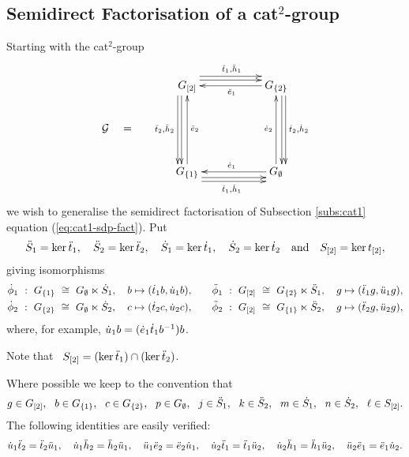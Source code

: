 

\bigskip
\subsection{Semidirect Factorisation of a cat$^2$-group}
\label{subs:sdpfact-catt}

Starting with the cat$^2$-group 
$$
\xymatrix @C=2pc @R=2pc{
 & \GGot \ar[dd] <-1.2ex>  \ar[dd] <-2.0ex>_{\ddttt,\ddhht}
     \ar[rr] <+1.2ex>  \ar[rr] <+2.0ex>^{\ddtto,\ddhho}
    &&  \GGbt  \ar[ll]^{\ddeeo}
            \ar[dd]<+1.2ex>  \ar[dd] <+2.0ex>^{\dttt,\dhht}  \\
\calG \quad = \quad
 &  &&   \\
 & \GGbo \ar[uu]_{\ddeet}
     \ar[rr] <-1.2ex>  \ar[rr] <-2.0ex>_{\dtto,\dhho} 
    &&  \GGe \ar[uu]^{\deet}   \ar[ll]_{\deeo} 
 \\
}
$$
we wish to generalise the semidirect factorisation of 
Subsection \ref{subs:cat1} equation (\ref{eq:cat1-sdp-fact}).
Put
$$
\ddot{S}_1 = \ker\ddot{t}_1, \quad
\ddot{S}_2 = \ker\ddot{t}_2, \quad
 \dot{S}_1 = \ker\dot{t}_1, \quad
 \dot{S}_2 = \ker\dot{t}_2 \quad\mbox{and}\quad
 S_{[2]} = \ker t_{[2]},
$$
giving isomorphisms
\begin{eqnarray*}
\dot{\phi}_1 ~:~ G_{\{1\}} ~\cong~ G_{\emptyset} \ltimes \dot{S}_1,
  \quad  b \mapsto (\dot{t}_1 b, \dot{u}_1 b), 
& \quad &
\ddot{\phi}_1 ~:~ G_{[2]} ~\cong~ G_{\{2\}} \ltimes \ddot{S}_1,
  \quad  g \mapsto (\ddot{t}_1 g, \ddot{u}_1 g),      \\
\dot{\phi}_2 ~:~ G_{\{2\}} ~\cong~ G_{\emptyset} \ltimes \dot{S}_2,
  \quad  c \mapsto (\dot{t}_2 c, \dot{u}_2 c),   
& \quad &
\ddot{\phi}_2 ~:~ G_{[2]} ~\cong~ G_{\{1\}} \ltimes \ddot{S}_2,
  \quad  g \mapsto (\ddot{t}_2 g, \ddot{u}_2 g), 
\end{eqnarray*}
where, for example, $\dot{u}_1 b = (\dot{e}_1\dot{t}_1 b^{-1})b$.

\medskip\noindent
Note that~ $S_{[2]} = (\ker \ddot{t}_1) \cap (\ker \ddot{t}_2)$.

\medskip\noindent
Where possible we keep to the convention that
$$
g \in G_{[2]},~~
b \in G_{\{1\}},~~
c \in G_{\{2\}},~~
p \in G_{\emptyset},~~
j \in \ddot{S}_1,~~
k \in \ddot{S}_2,~~
m \in \dot{S}_1,~~
n \in \dot{S}_2,~~
\ell \in S_{[2]}.
$$
The following identities are easily verified:
\begin{equation} \label{eq:cat2gp-ids}
\dot{u}_1\ddot{t}_2 = \ddot{t}_2\ddot{u}_1, \quad
\dot{u}_1\ddot{h}_2 = \ddot{h}_2\ddot{u}_1, \quad
\ddot{u}_1\ddot{e}_2 = \ddot{e}_2\dot{u}_1, \quad
\dot{u}_2\ddot{t}_1 = \ddot{t}_1\ddot{u}_2, \quad
\dot{u}_2\ddot{h}_1 = \ddot{h}_1\ddot{u}_2, \quad
\ddot{u}_2\ddot{e}_1 = \ddot{e}_1\dot{u}_2. 
\end{equation} 

